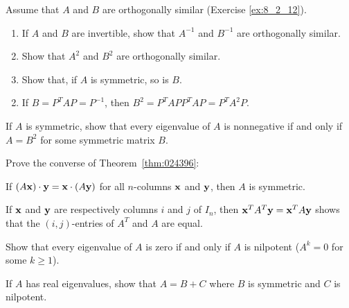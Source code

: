 \begin{multicols}{2}
\begin{ex}
Assume that $A$ and $B$ are orthogonally similar (Exercise \ref{ex:8_2_12}).


\begin{enumerate}[label={\alph*.}]
\item If $A$ and $B$ are invertible, show that $A^{-1}$ and $B^{-1}$ are orthogonally similar.

\item Show that $A^{2}$ and $B^{2}$ are orthogonally similar.

\item Show that, if $A$ is symmetric, so is $B$.

\end{enumerate}
\begin{sol}
\begin{enumerate}[label={\alph*.}]
\setcounter{enumi}{1}
\item  If $B = P^{T}AP = P^{-1}$, then $B^{2} = P^{T}APP^{T}AP = P^{T}A^{2}P$.

\end{enumerate}
\end{sol}
\end{ex}

\begin{ex}
If $A$ is symmetric, show that every eigenvalue of $A$ is nonnegative if and only if $A = B^{2}$ for some symmetric matrix $B$.
\end{ex}

\begin{ex}\label{ex:8_2_15}
Prove the converse of Theorem~\ref{thm:024396}:


If $(A\textbf{x}) \cdot \textbf{y} = \textbf{x} \cdot (A\textbf{y})$ for all $n$-columns $\textbf{x}$ and $\textbf{y}$, then $A$ is symmetric.

\begin{sol}
If $\textbf{x}$ and $\textbf{y}$ are respectively columns $i$ and $j$ of $I_{n}$, then $\textbf{x}^{T}A^{T}\textbf{y} = \textbf{x}^{T}A\textbf{y}$ shows that the $(i, j)$-entries of $A^{T}$ and $A$ are equal.
\end{sol}
\end{ex}

\begin{ex}
Show that every eigenvalue of $A$ is zero if and only if $A$ is nilpotent ($A^{k} = 0$ for some $k \geq 1$).
\end{ex}

\begin{ex}
If $A$ has real eigenvalues, show that $A = B + C$ where $B$ is symmetric and $C$ is nilpotent. 
\end{ex}


\end{multicols}
